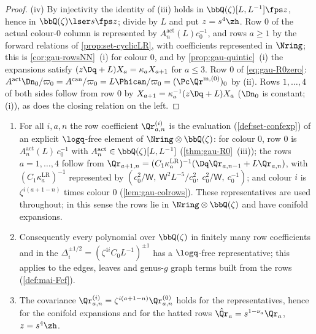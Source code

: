 \begin{proof}
(iv) By injectivity the identity of (iii) holds in $\bbQ(\zeta)[L,L^{-1}]\fps z$, hence in $\bbQ(\zeta)\lser s\fps z$; divide by $L$ and put $z=s^4\zh$. Row $0$ of the actual colour-$0$ column is represented by $A^{\mathrm{act}}_n(L)c_0^{-1}$, and rows $a\geq1$ by the forward relations of \cref{prop:set-cyclicLR}, with coefficients represented in $\Nring$; this is \cref{cor:gau-rowsNN}~(i) for colour $0$, and by \cref{prop:gau-quintic}~(i) the expansions satisfy $(z\Dq+L)X_a=\kappa_aX_{a+1}$ for $a\leq3$. Row $0$ of \eqref{eq:gau-R0zero}: $A^{\mathrm{act}}\Dn_0/\varpi_0=A^{\mathrm{can}}/\varpi_0=L\Phican/\varpi_0=(\Pc\Qr^{\mathrm m,(0)})_0$ by (ii). Rows $1,\dots,4$ of both sides follow from row $0$ by $X_{a+1}=\kappa_a^{-1}(z\Dq+L)X_a$ ($\Dn_0$ is constant; (i)), as does the closing relation on the left.
\end{proof}

\begin{cor}
\label{cor:gau-rowsNN}
\begin{enumerate}
\item For all $i,a,n$ the row coefficient $\Qr^{(i)}_{a,n}$ is the evaluation (\cref{def:set-confexp}) of an explicit $\logq$-free element of $\Nring\otimes\bbQ(\zeta)$: for colour $0$, row $0$ is $A^{\mathrm{act}}_n(L)\,c_0^{-1}$ with $A^{\mathrm{act}}_n\in\bbQ(\zeta)[L,L^{-1}]$ (\cref{thm:gau-R0}~(iii)); the rows $a=1,\dots,4$ follow from $\Qr_{a+1,n}=(C_1\kappa^{\mathrm{LR}}_a)^{-1}(\Dq\Qr_{a,n-1}+L\Qr_{a,n})$, with $(C_1\kappa^{\mathrm{LR}}_a)^{-1}$ represented by $(c_0^2/\mathsf W,\ \mathsf W^2L^{-5}/c_0^2,\ c_0^2/\mathsf W,\ c_0^{-1})$; and colour $i$ is $\zeta^{i(a+1-n)}$ times colour $0$ (\cref{lem:gau-colrows}). These representatives are used throughout; in this sense the rows lie in $\Nring\otimes\bbQ(\zeta)$ and have conifold expansions.
\item Consequently every polynomial over $\bbQ(\zeta)$ in finitely many row coefficients and in the $\Delta_i^{\pm1/2}=(\zeta^{4i}C_0L^{-1})^{\pm1}$ has a $\logq$-free representative; this applies to the edges, leaves and genus-$g$ graph terms built from the rows (\cref{def:mai-Fcf}).
\item The covariance $\Qr^{(i)}_{a,n}=\zeta^{i(a+1-n)}\Qr^{(0)}_{a,n}$ holds for the representatives, hence for the conifold expansions and for the hatted rows $\hat{\Qr}_a=s^{1-\nu_a}\Qr_a$, $z=s^4\zh$.
\end{enumerate}
\end{cor}

